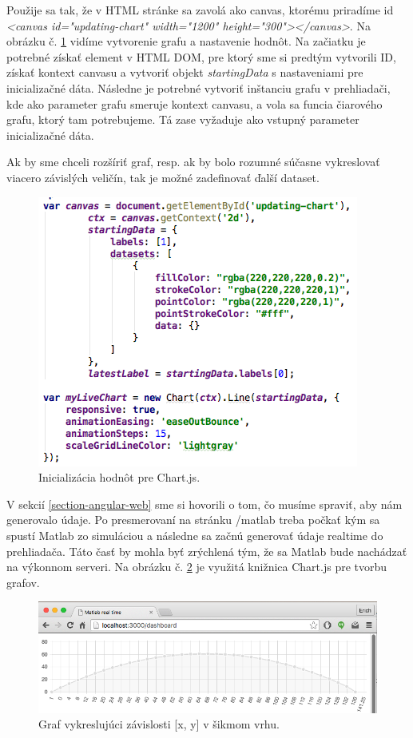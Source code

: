 Použije sa tak, že v HTML stránke sa zavolá ako canvas, ktorému priradíme id \textit{<canvas id="updating-chart" width="1200" height="300"></canvas>}. Na obrázku č. \ref{img-angular-chartjs-canvas} vidíme vytvorenie grafu a nastavenie hodnôt. Na začiatku je potrebné získať element v HTML DOM, pre ktorý sme si predtým vytvorili ID, získať kontext canvasu a vytvoriť objekt \textit{startingData} s nastaveniami pre inicializačné dáta. 
Následne je potrebné vytvoriť inštanciu grafu v prehliadači, kde ako parameter grafu smeruje kontext canvasu, a vola sa funcia čiarového grafu, ktorý tam potrebujeme. Tá zase vyžaduje ako vstupný parameter inicializačné dáta.

Ak by sme chceli rozšíriť graf, resp. ak by bolo rozumné súčasne vykreslovať viacero závislých veličín, tak je možné zadefinovať ďalší dataset.

\begin{figure}[H]
  \centering
  \includegraphics[scale=0.7]{img/code/angular-chartjs-code.png}
  \caption{Inicializácia hodnôt pre Chart.js.}
  \label{img-angular-chartjs-canvas}
\end{figure}

V sekcií \ref{section-angular-web} sme si hovorili o tom, čo musíme spraviť, aby nám generovalo údaje. Po presmerovaní na stránku /matlab treba počkať kým sa spustí Matlab zo simuláciou a následne sa začnú generovať údaje realtime do prehliadača. Táto časť by mohla byť zrýchlená tým, že sa Matlab bude nachádzať na výkonnom serveri. Na obrázku č. \ref{img-angular-chartjs} je využitá knižnica Chart.js pre tvorbu grafov.

\begin{figure}[H]
  \centering
  \includegraphics[scale=0.5]{img/code/angular-chartjs.png}
  \caption{Graf vykreslujúci závislosti [x, y] v šikmom vrhu.}
  \label{img-angular-chartjs}
\end{figure}

